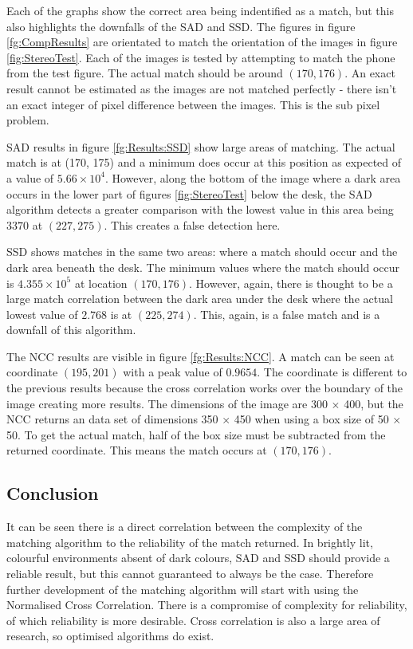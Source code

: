 Each of the graphs show the correct area being indentified as a match, but this also highlights the downfalls of the SAD and SSD. The figures in figure \ref{fg:CompResults} are orientated to match the orientation of the images in figure \ref{fig:StereoTest}. Each of the images is tested by attempting to match the phone from the test figure. The actual match should be around $(170, 176)$. An exact result cannot be estimated as the images are not matched perfectly - there isn't an exact integer of pixel difference between the images. This is the sub pixel problem.

SAD results in figure \ref{fg:Results:SSD} show large areas of matching. The actual match is at (170, 175) and a minimum does occur at this position as expected of a value of $5.66\times 10^4$. However, along the bottom of the image where a dark area occurs in the lower part of figures \ref{fig:StereoTest} below the desk, the SAD algorithm detects a greater comparison with the lowest value in this area being $3370$ at $(227, 275)$. This creates a false detection here. 

SSD shows matches in the same two areas: where a match should occur and the dark area beneath the desk. The minimum values where the match should occur is $4.355 \times 10^5$ at location $(170,176)$. However, again, there is thought to be a large match correlation between the dark area under the desk where the actual lowest value of $2.768$ is at $(225,274)$. This, again, is a false match and is a downfall of this algorithm. 

The NCC results are visible in figure \ref{fg:Results:NCC}. A match can be seen at coordinate $(195,201)$ with a peak value of $0.9654$. The coordinate is different to the previous results because the cross correlation works over the boundary of the image creating more results. The dimensions of the image are 300 $\times$ 400, but the NCC returns an data set of dimensions 350 $\times$ 450 when using a box size of 50 $\times$ 50. To get the actual match, half of the box size must be subtracted from the returned coordinate. This means the match occurs at $(170,176)$. 

\subsection{Conclusion}
It can be seen there is a direct correlation between the complexity of the matching algorithm to the reliability of the match returned. In brightly lit, colourful environments absent of dark colours, SAD and SSD should provide a reliable result, but this cannot guaranteed to always be the case. Therefore further development of the matching algorithm will start with using the Normalised Cross Correlation. There is a compromise of complexity for reliability, of which reliability is more desirable. Cross correlation is also a large area of research, so optimised algorithms do exist. 

